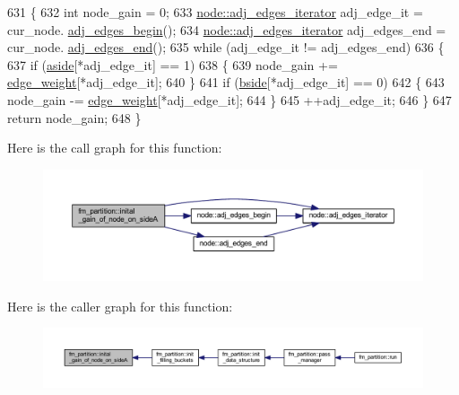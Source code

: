 \begin{DoxyCode}
631 \{
632     \textcolor{keywordtype}{int} node\_gain = 0;
633     \mbox{\hyperlink{classnode_a12cb1a2167f5f03c054de5e707d3156f}{node::adj\_edges\_iterator}} adj\_edge\_it = cur\_node.
      \mbox{\hyperlink{classnode_a788d3e932a5c164caa5ec82aa47551b2}{adj\_edges\_begin}}();
634     \mbox{\hyperlink{classnode_a12cb1a2167f5f03c054de5e707d3156f}{node::adj\_edges\_iterator}} adj\_edges\_end = cur\_node.
      \mbox{\hyperlink{classnode_aa1e7887d29390297580769454f769ad6}{adj\_edges\_end}}();
635     \textcolor{keywordflow}{while} (adj\_edge\_it != adj\_edges\_end)
636     \{
637     \textcolor{keywordflow}{if} (\mbox{\hyperlink{classfm__partition_a14b0aa9a91a6e7fa3035669cf5056275}{aside}}[*adj\_edge\_it] == 1)
638     \{
639         node\_gain += \mbox{\hyperlink{classfm__partition_adfe6147ba3f9c785f613b472f950595f}{edge\_weight}}[*adj\_edge\_it];
640     \}
641     \textcolor{keywordflow}{if} (\mbox{\hyperlink{classfm__partition_aa75765887173fb06b076b6cae12d4e66}{bside}}[*adj\_edge\_it] == 0)
642     \{
643         node\_gain -= \mbox{\hyperlink{classfm__partition_adfe6147ba3f9c785f613b472f950595f}{edge\_weight}}[*adj\_edge\_it];
644     \}
645     ++adj\_edge\_it;
646     \}
647     \textcolor{keywordflow}{return} node\_gain;
648 \}
\end{DoxyCode}
Here is the call graph for this function\+:\nopagebreak
\begin{figure}[H]
\begin{center}
\leavevmode
\includegraphics[width=350pt]{classfm__partition_a50c61b9d27e83a98e2e04a47b51670b6_cgraph}
\end{center}
\end{figure}
Here is the caller graph for this function\+:\nopagebreak
\begin{figure}[H]
\begin{center}
\leavevmode
\includegraphics[width=350pt]{classfm__partition_a50c61b9d27e83a98e2e04a47b51670b6_icgraph}
\end{center}
\end{figure}
\mbox{\label{classfm__partition_aa217da6a3c8a736e9e51aa348c951501}} 
